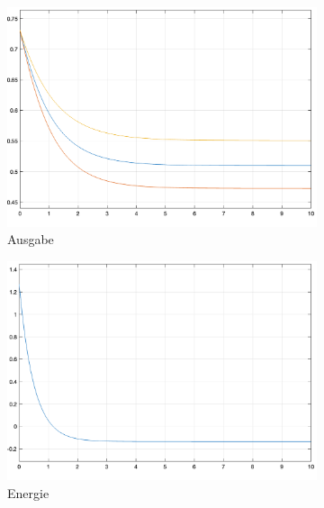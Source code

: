 \begin{figure}[h]
  \caption{Erste Simulation des \ac{hnn}}
  \centering
  \begin{subfigure}[b]{0.32\textwidth}
    \includegraphics[width=\textwidth]{abbildungen/hnn_simulation_1_ausgabe.png}
    \caption{Ausgabe}
  \end{subfigure}%
  \hfill
  \begin{subfigure}[b]{0.32\textwidth}
    \includegraphics[width=\textwidth]{abbildungen/hnn_simulation_1_energiefunktion.png}
    \caption{Energie}
  \end{subfigure}%
  \hfill
  \begin{subfigure}[b]{0.32\textwidth}

\end{subfigure}
\end{figure}
